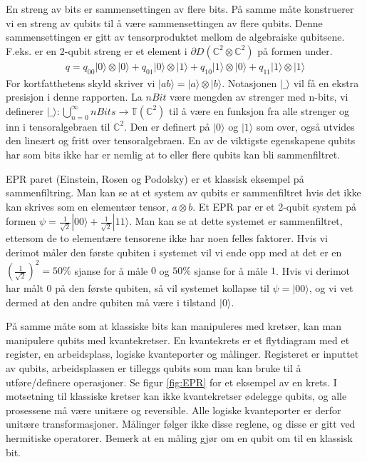         En streng av bits er sammensettingen av flere bits. På samme måte konstruerer vi en streng av qubits til å være sammensettingen av flere qubits. Denne sammensettingen er gitt av tensorproduktet mellom de algebraiske qubitsene. F.eks. er en 2-qubit streng er et element i $\partial D(\mathbb{C}^2\otimes\mathbb{C}^2)$ på formen under.
        \begin{align*}
            q = q_{00}|0\rangle\otimes |0\rangle + q_{01}|0\rangle\otimes |1\rangle + q_{10}|1\rangle\otimes|0\rangle + q_{11}|1\rangle\otimes |1\rangle
        \end{align*}
        For kortfatthetens skyld skriver vi $|ab\rangle = |a\rangle\otimes |b\rangle$. Notasjonen $|\_\rangle$ vil få en ekstra presisjon i denne rapporten. La $nBit$ være mengden av strenger med n-bits, vi definerer $|\_\rangle : \bigcup_{n=0}^{\infty}nBits \rightarrow \mathbb{T}(\mathbb{C}^2)$ til å være en funksjon fra alle strenger og inn i tensoralgebraen til $\mathbb{C}^2$. Den er definert på $|0\rangle$ og $|1\rangle$ som over, også utvides den lineært og fritt over tensoralgebraen. En av de viktigste egenskapene qubits har som bits ikke har er nemlig at to eller flere qubits kan bli sammenfiltret.

        EPR paret (Einstein, Rosen og Podolsky) er et klassisk eksempel på sammenfiltring. Man kan se at et system av qubits er sammenfiltret hvis det ikke kan skrives som en elementær tensor, $a\otimes b$. Et EPR par er et 2-qubit system på formen $\psi = \frac{1}{\sqrt{2}}|00\rangle + \frac{1}{\sqrt{2}}|11\rangle$. Man kan se at dette systemet er sammenfiltret, ettersom de to elementære tensorene ikke har noen felles faktorer. Hvis vi derimot måler den første qubiten i systemet vil vi ende opp med at det er en $(\frac{1}{\sqrt{2}})^2 = 50\%$ sjanse for å måle $0$ og $50\%$ sjanse for å måle $1$. Hvis vi derimot har målt $0$ på den første qubiten, så vil systemet kollapse til $\psi = |00\rangle$, og vi vet dermed at den andre qubiten må være i tilstand $|0\rangle$.

        På samme måte som at klassiske bits kan manipuleres med kretser, kan man manipulere qubits med kvantekretser. En kvantekrets er et flytdiagram med et register, en arbeidsplass, logiske kvanteporter og målinger. Registeret er inputtet av qubits, arbeidsplassen er tilleggs qubits som man kan bruke til å utføre/definere operasjoner. Se figur \ref{fig:EPR} for et eksempel av en krets. I motsetning til klassiske kretser kan ikke kvantekretser ødelegge qubits, og alle prosessene må være unitære og reversible. Alle logiske kvanteporter er derfor unitære transformasjoner. Målinger følger ikke disse reglene, og disse er gitt ved hermitiske operatorer. Bemerk at en måling gjør om en qubit om til en klassisk bit.


